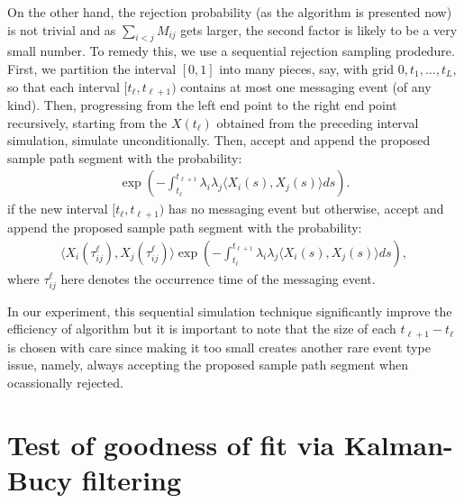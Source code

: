 \documentclass[12pt]{article}%
\begin{document}
On the other hand, the rejection probability (as the algorithm is presented now) is not trivial 
and as $\sum_{i<j} M_{ij}$ gets larger, the second factor is likely to be a very small number.  
To remedy this, we use a sequential rejection sampling prodedure.  
First, we partition the interval $[0,1]$ into many pieces, say, with grid $0,t_1,\ldots, t_L$, 
so that each interval $[t_{\ell},t_{\ell+1})$ contains at most one messaging event (of any kind). 
Then, progressing from the left end point to the right end point recursively, starting 
from the $X(t_{\ell})$ obtained from the preceding interval simulation, simulate unconditionally.  
Then, accept and append the proposed sample path segment with the probability:
\begin{eqnarray}
\exp\left(-\int_{t_{\ell}}^{t_{\ell+1}} \lambda_i \lambda_j \langle X_{i}(s), X_j(s)\rangle ds\right).
\end{eqnarray}
if the new interval $[t_{\ell},t_{\ell+1})$ has no messaging event but otherwise, accept and append the proposed sample path segment with the probability:
\begin{eqnarray}
\langle X_i(\tau_{ij}^\ell),X_j(\tau_{ij}^\ell)\rangle 
\exp\left(-\int_{t_{\ell}}^{t_{\ell+1}} \lambda_i \lambda_j \langle X_i(s), X_j(s)\rangle ds\right),
\end{eqnarray}
where $\tau_{ij}^\ell$ here denotes the occurrence time of the messaging event.

In our experiment, this sequential simulation technique significantly improve the efficiency of algorithm 
but it is important to note that the size of each $t_{\ell+1} - t_\ell$ is chosen with care since making 
it too small creates another rare event type issue, namely, always accepting the proposed sample path 
segment when ocassionally rejected.   


\section{Test of goodness of fit via Kalman-Bucy filtering}
\end{document}
